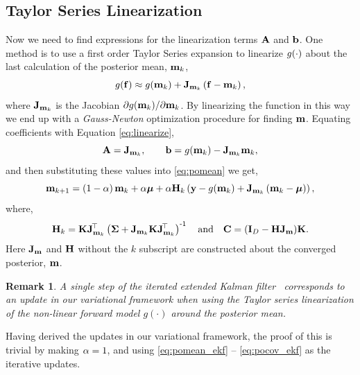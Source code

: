 \documentclass{article} %
\newtheorem{remark}{Remark}
\begin{document}
\subsection{Taylor Series Linearization}

Now we need to find expressions for the linearization terms $\mathbf{A}$ and
$\mathbf{b}$. One method is to use a first order Taylor Series expansion to 
linearize $g\!\left({{\cdot}}\right)$ about the last calculation of the posterior mean, 
$\mathbf{m}_k$,
\begin{equation}
    g\!\left({{\mathbf{f}}}\right) \approx g\!\left({{\mathbf{m}_k}}\right) +
    \mathbf{J}_{\mathbf{m}_k}\left({\mathbf{f} - \mathbf{m}_k}\right),
\end{equation}
where $\mathbf{J}_{\mathbf{m}_k}$ is the Jacobian $\partial g\!\left({{\mathbf{m}_k}}\right)\!/
\partial\mathbf{m}_k$. By linearizing the function in this way we end up with a
\emph{Gauss-Newton} optimization procedure for finding $\mathbf{m}$. Equating
coefficients with Equation \eqref{eq:linearize}, 
\begin{equation}
    \mathbf{A} = \mathbf{J}_{\mathbf{m}_k}, \qquad \mathbf{b} = g\!\left({{\mathbf{m}_k}}\right) -
    \mathbf{J}_{\mathbf{m}_k}\mathbf{m}_k,
\end{equation}
and then substituting these values into \eqref{eq:pomean} we get,
\begin{equation}
    \mathbf{m}_{k+1} = \left({1-\alpha}\right)\mathbf{m}_k + \alpha\boldsymbol{\mu} 
        + \alpha\mathbf{H}_k\left({\mathbf{y} - g\!\left({{\mathbf{m}_k}}\right) 
        + \mathbf{J}_{\mathbf{m}_k}\left({\mathbf{m}_k - \boldsymbol{\mu}}\right)}\right),
    \label{eq:pomean_ekf}
\end{equation}
where,
\begin{equation}
    \mathbf{H}_k = \mathbf{K}\mathbf{J}_{\mathbf{m}_k}^{\!\top}\left({\boldsymbol{\Sigma} +
        \mathbf{J}_{\mathbf{m}_k}\mathbf{K}\mathbf{J}_{\mathbf{m}_k}^{\!\top}}\right)^{\text{-}1}
    \quad\text{and}\quad
    \mathbf{C} = \left({\mathbf{I}_{D} - \mathbf{H}\mathbf{J}_{\mathbf{m}}}\right)\!\mathbf{K}.
    \label{eq:pocov_ekf}
\end{equation}
Here $\mathbf{J}_{\mathbf{m}}$ and $\mathbf{H}$ without the $k$ subscript are constructed
about the converged posterior, $\mathbf{m}$. 
%
\begin{remark}
A single step of the  iterated extended Kalman filter~\cite{Bell1993,
    Sibley2006} corresponds to an update  in our variational framework when
using the Taylor series linearization of the non-linear forward model
$g(\cdot)$ around the posterior mean.
\end{remark}
Having derived the updates in our variational framework, the proof of this is
trivial by making  $\alpha =1$, and using \eqref{eq:pomean_ekf} --
\eqref{eq:pocov_ekf} as the iterative updates.
\end{document}
